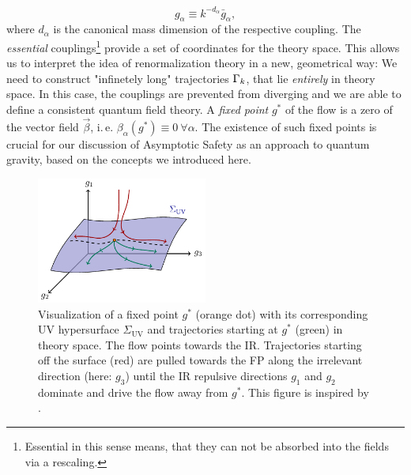 \begin{equation}
	g_{\alpha} \equiv k^{-d_{\alpha}} \bar{g}_{\alpha},
\end{equation}
where $d_{\alpha}$ is the canonical mass dimension of the respective coupling. The \textit{essential} couplings\footnote{Essential in this sense means, that they can not be absorbed into the fields via a rescaling.} provide a set of coordinates for the theory space. This allows us to interpret the idea of renormalization theory in a new, geometrical way: We need to construct "infinetely long" trajectories $\Gamma_{k}$, that lie \textit{entirely} in theory space. In this case, the couplings are prevented from diverging and we are able to define a consistent quantum field theory. \newpage
A \textit{fixed point} $g^{*}$ of the flow is a zero of the vector field $\vec{\beta}$, i.\,e.  $\beta_{\alpha}(g^{*})\equiv 0 \ \forall \alpha$. The existence of such fixed points is crucial for our discussion of Asymptotic Safety as an approach to quantum gravity, based on the concepts we introduced here. \\
\begin{figure}[t]
	\centering
	\includegraphics[width=0.5\textwidth]{figs/TikZ/hypersurface}
	\caption[Visualization of a fixed point with its corresponding UV hypersurface $\Sigma_{\mathrm{UV}}$ in theory space.]{Visualization of a fixed point $g^{*}$ (orange dot) with its corresponding UV hypersurface $\Sigma_{\mathrm{UV}}$ and trajectories starting at $g^{*}$ (green) in theory space. The flow points towards the IR. Trajectories starting off the surface (red) are pulled towards the FP along the irrelevant direction (here: $g_3$) until  the IR repulsive directions $g_1$ and $g_2$ dominate and drive the flow away from $g^{*}$. This figure is inspired by \cite{Eichhorn2018}.}\label{fig:hypersurface}
	\hrulefill
\end{figure}
